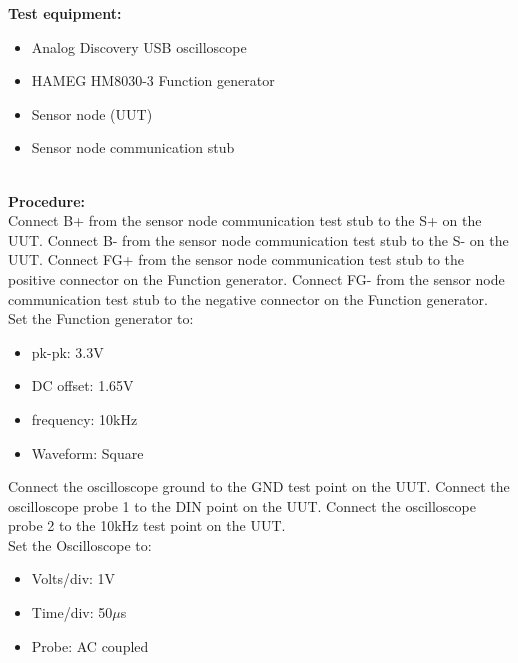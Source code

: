 \textbf{Test equipment:}
\begin{itemize}
	\item Analog Discovery USB oscilloscope
	\item HAMEG HM8030-3 Function generator
	\item Sensor node (UUT)
	\item Sensor node communication stub
\end{itemize}
\ \\
\textbf{Procedure:}\\
Connect B+ from the sensor node communication test stub to the S+ on the UUT. Connect B- from the sensor node communication test stub to the S- on the UUT.
Connect FG+ from the sensor node communication test stub to the positive connector on the Function generator. Connect FG- from the sensor node communication test stub to the negative connector on the Function generator.\\ Set the Function generator to:
\begin{itemize}
	\item pk-pk: 3.3V
	\item DC offset: 1.65V
	\item frequency: 10kHz
	\item Waveform: Square
\end{itemize}

Connect the oscilloscope ground to the GND test point on the UUT.
Connect the oscilloscope probe 1 to the DIN point on the UUT.
Connect the oscilloscope probe 2 to the 10kHz test point on the UUT.\\
Set the Oscilloscope to:
\begin{itemize}
	\item Volts/div: 1V
	\item Time/div: 50$\mu$s
	\item Probe: AC coupled
\end{itemize}

